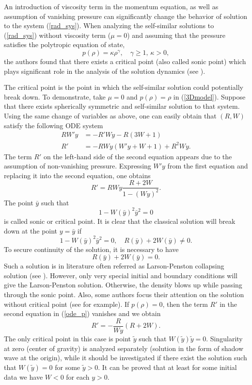 \documentclass[reqno]{article}%
\theoremstyle{plain}
\theoremstyle{definition}
\theoremstyle{remark}
\numberwithin{equation}{section}
\begin{document}
An introduction of viscosity term in the momentum equation, as well as assumption of vanishing pressure can significantly change the behavior of solution to the system (\ref{rad_sys}). When analyzing the self-similar solutions to (\ref{rad_sys}) without viscosity term ($\mu=0$) and assuming that the pressure satisfies the polytropic equation of state,
\[p(\rho)=\kappa \rho^\gamma, \quad \gamma\geq 1,\,\kappa>0,\]
 the authors found that there exists a critical point (also called sonic point) which plays significant role in the analysis of the solution dynamics (see \cite{Hadzgamma,Hadz1,shu}). 
 

 The critical point is the point in which the self-similar solution could potentially break down. To demonstrate, take $\mu=0$ and $p(\rho)=\rho$ in (\ref{3Dmodel}). Suppose that there exists spherically symmetric and self-similar solution to that system. Using the same change of variables as above, one can easily obtain that $(R,W)$ satisfy the following ODE system
 \begin{equation}\label{ode_p}
 \begin{split}
 RW'y&=-R'Wy-R(3W+1)\\
 R'&=-RWy(W'y+W+1)+R^2Wy.
 \end{split}\end{equation}
 The term $R'$ on the left-hand side of the second equation appears due to the  assumption of non-vanishing pressure.
 Expressing $W'y$ from the first equation and replacing it into the second equation, one obtains 
 \[R'=RWy\frac{R+2W}{1-(Wy)^2}.\]
 The point $\bar{y}$ such that
 \[1-W(\bar{y})^2\bar{y}^2=0\]
 is called sonic or critical point.
 It is clear that the classical solution will break down at the point $y=\bar{y}$ if
 \[1-W(\bar{y})^2\bar{y}^2=0,\quad R(\bar{y})+2W(\bar{y})\neq 0.\]
 To secure continuity of the solution, it is necessary to have
 \[R(\bar{y})+2W(\bar{y})=0.\]
 Such a solution is in literature often referred as  Larson-Penston collapsing solution (see \cite{Hadz1, Larson, Penston}). However, only very special initial and boundary conditions will give the Larson-Penston solution. Otherwise, the density blows up while passing through the sonic point. Also, some authors focus their attention  on the solution without critical point (see \cite{shu} for example).
   If $p(\rho)=0$, then the term $R'$ in the second equation in (\ref{ode_p}) vanishes and we obtain
 \[R'=-\frac{R}{Wy}(R+2W).\]
 The only critical point in this case is point $\tilde{y}$ such that $W(\tilde{y})\tilde{y}=0$. Singularity at zero (center of gravity) is analyzed separately (solution in the form of shadow wave at the origin),  while it should be investigated if there exist the solution such that $W(\tilde{y})=0$ for some $\tilde{y}>0$.  It can be proved that at least for some initial data we have $W<0$ for each $y>0$. 
 
\end{document}
